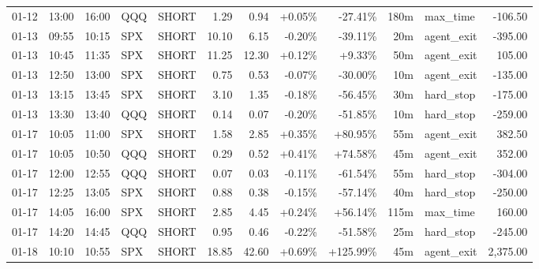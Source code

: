 \documentclass[11pt,a4paper,twoside]{article}
\begin{document}
\begin{center}
\begin{longtable}{>{\color{txtmain}}l l l l l r r r r r >{\color{txtmain}}l r}
01-12 & 13:00 & 16:00 & QQQ & SHORT & 1.29 & 0.94 & \textcolor{wingreen}{+0.05\%} & \textcolor{lossred}{-27.41\%} & 180m & max\_time & \textcolor{lossred}{-106.50} \\
01-13 & 09:55 & 10:15 & SPX & SHORT & 10.10 & 6.15 & \textcolor{lossred}{-0.20\%} & \textcolor{lossred}{-39.11\%} & 20m & agent\_exit & \textcolor{lossred}{-395.00} \\
01-13 & 10:45 & 11:35 & SPX & SHORT & 11.25 & 12.30 & \textcolor{wingreen}{+0.12\%} & \textcolor{wingreen}{+9.33\%} & 50m & agent\_exit & \textcolor{wingreen}{105.00} \\
01-13 & 12:50 & 13:00 & SPX & SHORT & 0.75 & 0.53 & \textcolor{lossred}{-0.07\%} & \textcolor{lossred}{-30.00\%} & 10m & agent\_exit & \textcolor{lossred}{-135.00} \\
01-13 & 13:15 & 13:45 & SPX & SHORT & 3.10 & 1.35 & \textcolor{lossred}{-0.18\%} & \textcolor{lossred}{-56.45\%} & 30m & hard\_stop & \textcolor{lossred}{-175.00} \\
01-13 & 13:30 & 13:40 & QQQ & SHORT & 0.14 & 0.07 & \textcolor{lossred}{-0.20\%} & \textcolor{lossred}{-51.85\%} & 10m & hard\_stop & \textcolor{lossred}{-259.00} \\
01-17 & 10:05 & 11:00 & SPX & SHORT & 1.58 & 2.85 & \textcolor{wingreen}{+0.35\%} & \textcolor{wingreen}{+80.95\%} & 55m & agent\_exit & \textcolor{wingreen}{382.50} \\
01-17 & 10:05 & 10:50 & QQQ & SHORT & 0.29 & 0.52 & \textcolor{wingreen}{+0.41\%} & \textcolor{wingreen}{+74.58\%} & 45m & agent\_exit & \textcolor{wingreen}{352.00} \\
01-17 & 12:00 & 12:55 & QQQ & SHORT & 0.07 & 0.03 & \textcolor{lossred}{-0.11\%} & \textcolor{lossred}{-61.54\%} & 55m & hard\_stop & \textcolor{lossred}{-304.00} \\
01-17 & 12:25 & 13:05 & SPX & SHORT & 0.88 & 0.38 & \textcolor{lossred}{-0.15\%} & \textcolor{lossred}{-57.14\%} & 40m & hard\_stop & \textcolor{lossred}{-250.00} \\
01-17 & 14:05 & 16:00 & SPX & SHORT & 2.85 & 4.45 & \textcolor{wingreen}{+0.24\%} & \textcolor{wingreen}{+56.14\%} & 115m & max\_time & \textcolor{wingreen}{160.00} \\
01-17 & 14:20 & 14:45 & QQQ & SHORT & 0.95 & 0.46 & \textcolor{lossred}{-0.22\%} & \textcolor{lossred}{-51.58\%} & 25m & hard\_stop & \textcolor{lossred}{-245.00} \\
01-18 & 10:10 & 10:55 & SPX & SHORT & 18.85 & 42.60 & \textcolor{wingreen}{+0.69\%} & \textcolor{wingreen}{+125.99\%} & 45m & agent\_exit & \textcolor{wingreen}{2,375.00} \\

\end{longtable}
\end{center}
\end{document}
